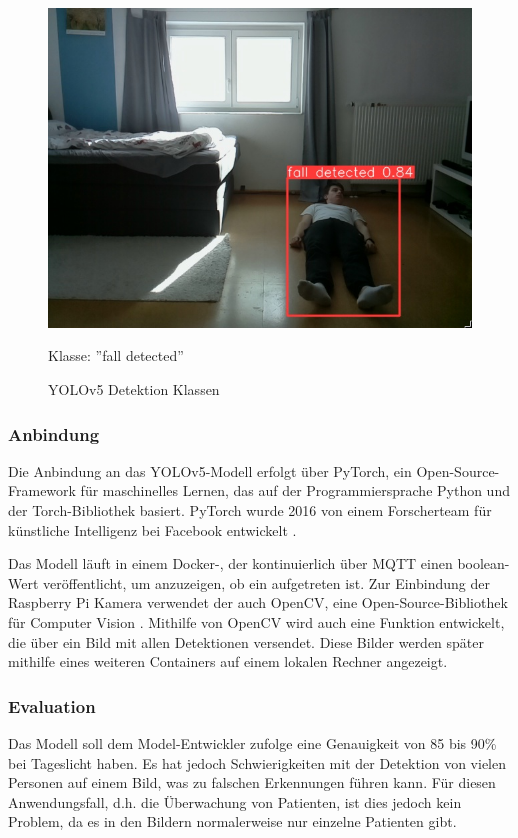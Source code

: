 \begin{figure}[H]
\begin{minipage}[b]{0.3\textwidth}
		\includegraphics[width=\textwidth]{images/fallen.png}
		\caption*{Klasse: ''fall detected''}
	\end{minipage}
	\caption{YOLOv5 Detektion Klassen}
	\label{fig:yolo_classes}
\end{figure}



\subsubsection{Anbindung}
Die Anbindung an das YOLOv5-Modell erfolgt über PyTorch, ein Open-Source-Framework für maschinelles Lernen, das auf der Programmiersprache Python und der Torch-Bibliothek basiert. PyTorch wurde 2016 von einem Forscherteam für künstliche Intelligenz bei Facebook entwickelt \cite{noauthor_pytorch_nodate}.

Das Modell läuft in einem Docker-, der kontinuierlich über MQTT einen boolean-Wert veröffentlicht, um anzuzeigen, ob ein  aufgetreten ist. Zur Einbindung der Raspberry Pi Kamera verwendet der  auch OpenCV, eine Open-Source-Bibliothek für Computer Vision \cite{OpenCV}. Mithilfe von OpenCV wird auch eine Funktion entwickelt, die über  ein Bild mit allen Detektionen versendet. Diese Bilder werden später mithilfe eines weiteren  Containers auf einem lokalen Rechner angezeigt.

\subsubsection{Evaluation}
Das Modell soll dem Model-Entwickler zufolge eine Genauigkeit von 85 bis 90\% bei Tageslicht haben. Es hat jedoch Schwierigkeiten mit der Detektion von vielen Personen auf einem Bild, was zu falschen Erkennungen führen kann. Für diesen Anwendungsfall, d.h. die Überwachung von Patienten, ist dies jedoch kein Problem, da es in den Bildern normalerweise nur einzelne Patienten gibt. 

